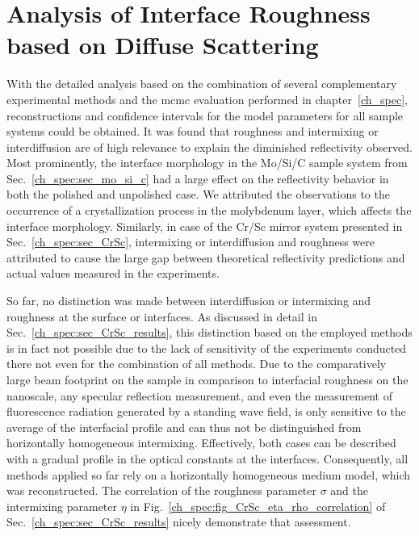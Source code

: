 \chapter{Analysis of Interface Roughness based on Diffuse Scattering} \label{ch_diff}
With the detailed analysis based on the combination of several complementary experimental methods and the \gls{mcmc} evaluation performed in chapter~\ref{ch_spec}, reconstructions and confidence intervals for the model parameters for all sample systems could be obtained. It was found that roughness and intermixing or interdiffusion are of high relevance to explain the diminished reflectivity observed. Most prominently, the interface morphology in the Mo/Si/C sample system from Sec.~\ref{ch_spec:sec_mo_si_c} had a large effect on the reflectivity behavior in both the polished and unpolished case. We attributed the observations to the occurrence of a crystallization process in the molybdenum layer, which affects the interface morphology. Similarly, in case of the Cr/Sc mirror system presented in Sec.~\ref{ch_spec:sec_CrSc}, intermixing or interdiffusion and roughness were attributed to cause the large gap between theoretical reflectivity predictions and actual values measured in the experiments.

So far, no distinction was made between interdiffusion or intermixing and roughness at the surface or interfaces. As discussed in detail in Sec.~\ref{ch_spec:sec_CrSc_results}, this distinction based on the employed methods is in fact not possible due to the lack of sensitivity of the experiments conducted there not even for the combination of all methods. Due to the comparatively large beam footprint on the sample in comparison to interfacial roughness on the nanoscale, any specular reflection measurement, and even the measurement of fluorescence radiation generated by a standing wave field, is only sensitive to the average of the interfacial profile and can thus not be distinguished from horizontally homogeneous intermixing. Effectively, both cases can be described with a gradual profile in the optical constants at the interfaces. Consequently, all methods applied so far rely on a horizontally homogeneous medium model, which was reconstructed. The correlation of the roughness parameter $\sigma$ and the intermixing parameter $\eta$ in Fig.~\ref{ch_spec:fig_CrSc_eta_rho_correlation} of Sec.~\ref{ch_spec:sec_CrSc_results} nicely demonstrate that assessment.

